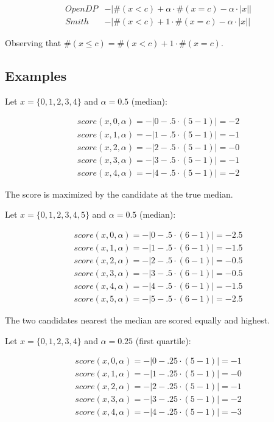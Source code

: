 \documentclass{article}
\begin{document}
\[
\begin{array}{cl}
    OpenDP &-|\#(x < c) + \alpha \cdot \#(x = c) - \alpha \cdot |x|| \\
    Smith &-|\#(x < c) + 1 \cdot \#(x = c) - \alpha \cdot |x||
\end{array}
\]

Observing that $\#(x \leq c) = \#(x < c) + 1 \cdot \#(x = c)$.


\subsection{Examples}

Let $x = \{0,1,2,3,4\}$ and $\alpha = 0.5$ (median):

\begin{align*}
    score(x, 0, \alpha) = -|0 - .5 \cdot (5 - 1)| = -2 \\
    score(x, 1, \alpha) = -|1 - .5 \cdot (5 - 1)| = -1 \\
    score(x, 2, \alpha) = -|2 - .5 \cdot (5 - 1)| = -0 \\
    score(x, 3, \alpha) = -|3 - .5 \cdot (5 - 1)| = -1 \\
    score(x, 4, \alpha) = -|4 - .5 \cdot (5 - 1)| = -2
\end{align*}

The score is maximized by the candidate at the true median.

Let $x = \{0,1,2,3,4,5\}$ and $\alpha = 0.5$ (median):

\begin{align*}
    score(x, 0, \alpha) = -|0 - .5 \cdot (6 - 1)| = -2.5 \\
    score(x, 1, \alpha) = -|1 - .5 \cdot (6 - 1)| = -1.5 \\
    score(x, 2, \alpha) = -|2 - .5 \cdot (6 - 1)| = -0.5 \\
    score(x, 3, \alpha) = -|3 - .5 \cdot (6 - 1)| = -0.5 \\
    score(x, 4, \alpha) = -|4 - .5 \cdot (6 - 1)| = -1.5 \\
    score(x, 5, \alpha) = -|5 - .5 \cdot (6 - 1)| = -2.5
\end{align*}

The two candidates nearest the median are scored equally and highest.

Let $x = \{0,1,2,3,4\}$ and $\alpha = 0.25$ (first quartile):

\begin{align*}
    score(x, 0, \alpha) = -|0 - .25 \cdot (5 - 1)| = -1 \\
    score(x, 1, \alpha) = -|1 - .25 \cdot (5 - 1)| = -0 \\
    score(x, 2, \alpha) = -|2 - .25 \cdot (5 - 1)| = -1 \\
    score(x, 3, \alpha) = -|3 - .25 \cdot (5 - 1)| = -2 \\
    score(x, 4, \alpha) = -|4 - .25 \cdot (5 - 1)| = -3
\end{align*}
\end{document}
